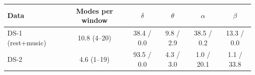 \small
\begin{tabular}{lccccc}
\hline
Data & Modes per window & $\delta$ & $\theta$ & $\alpha$ & $\beta$ \\
\hline
DS-1 (rest+music) & 10.8 (4--20) & 38.4 / 0.0 & 9.8 / 2.9 & 38.5 / 0.2 & 13.3 / 0.0 \\
DS-2 & 4.6 (1--19) & 93.5 / 0.0 & 4.3 / 3.0 & 1.0 / 20.1 & 1.1 / 33.8 \\
\hline
\end{tabular}
